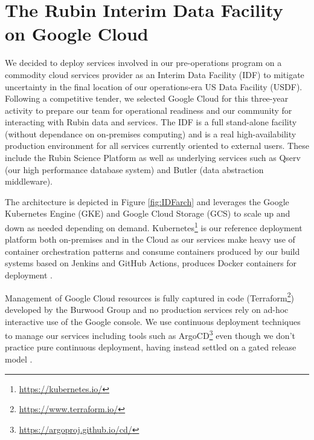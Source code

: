 \documentclass[11pt,twoside]{article}
\begin{document}
\section{The Rubin Interim Data Facility on Google Cloud}

We decided to deploy services involved in our pre-operations program on a commodity cloud services provider as an Interim Data Facility (IDF) to mitigate uncertainty in the final location of our operations-era US Data Facility (USDF).
Following a competitive tender, we selected Google Cloud for this three-year activity to prepare our team for operational readiness and our community for interacting with Rubin data and services.
The IDF is a full stand-alone facility (without dependance on on-premises computing) and is a real high-availability production environment for all services currently oriented to external users. These include the Rubin Science Platform as well as underlying services such as Qserv (our high performance database system) and Butler (data abstraction middleware).

The architecture is depicted in Figure \ref{fig:IDFarch} and leverages the Google Kubernetes Engine (GKE) and Google Cloud Storage (GCS) to scale up and down as needed depending on demand.
Kubernetes\footnote{\url{https://kubernetes.io/}} is our reference deployment platform both on-premises and in the Cloud as our services make heavy use of container orchestration patterns and consume containers produced by our build systems based on Jenkins and GitHub Actions,  produces Docker containers for deployment \citep[see e.g.,][]{2018SPIE10707E..09J}.

Management of Google Cloud resources is fully captured in code (Terraform\footnote{\url{https://www.terraform.io/}}) developed by the Burwood Group and no production services rely on ad-hoc interactive use of the Google console. We use continuous deployment techniques to manage our services including tools such as ArgoCD\footnote{\url{https://argoproj.github.io/cd/}} even though we don't practice pure continuous deployment, having instead settled on a gated release model \citep{SQR-056}.

\end{document}
